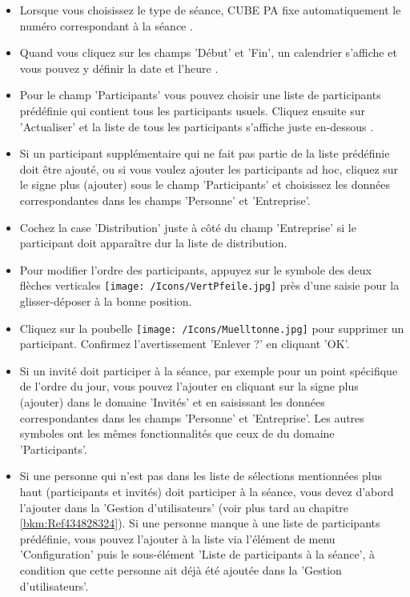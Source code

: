 \begin{itemize}
\item 
Lorsque vous choisissez le type de séance, CUBE PA fixe automatiquement le numéro correspondant à la séance .
\item 
Quand vous cliquez sur les champs 'Début' et 'Fin', un calendrier s'affiche et vous pouvez y définir la date et l'heure .
\item 
Pour le champ 'Participants' vous pouvez choisir une liste de participants prédéfinie  qui contient tous les participants usuels. Cliquez ensuite sur 'Actualiser'  et la liste de tous les participants s'affiche juste en-dessous .
\item 
Si un participant supplémentaire qui ne fait pas partie de la liste prédéfinie doit être ajouté, ou  si vous voulez ajouter les participants ad hoc, cliquez sur le signe plus (ajouter) sous le champ 'Participants'  et choisissez les données correspondantes dans les champs 'Personne' et 'Entreprise'. 
\item
Cochez la case 'Distribution'  juste à côté du champ 'Entreprise' si le participant doit apparaître dur la liste de distribution.
\item 
Pour modifier l'ordre des participants, appuyez sur le symbole des deux flèches verticales \texttt{[image: /Icons/VertPfeile.jpg]}  près d'une saisie pour la glisser-déposer à la bonne position.
\item 
Cliquez sur la poubelle \texttt{[image: /Icons/Muelltonne.jpg]}  pour supprimer un participant. Confirmez l'avertissement 'Enlever ?' en cliquant 'OK'.
\item 
Si un invité doit participer à la séance, par exemple pour un point spécifique de l'ordre du jour, vous pouvez l'ajouter en cliquant sur la signe plus (ajouter) dans le domaine 'Invités' et en saisissant les données correspondantes dans les champs 'Personne' et 'Entreprise'. Les autres symboles ont les mêmes fonctionnalités que ceux de du domaine 'Participants'.
\item 
Si une personne qui n'est pas dans les liste de sélections mentionnées plus haut (participants et invités) doit participer à la séance, vous devez d'abord l'ajouter dans la 'Gestion d'utilisateurs' (voir plus tard au chapitre \ref{bkm:Ref434828324}). Si une personne manque à une liste de participants prédéfinie, vous pouvez l'ajouter à la liste via l'élément de menu 'Configuration' puis le sous-élément 'Liste de participants à la séance', à condition que cette personne ait déjà été ajoutée dans la 'Gestion d'utilisateurs'.
\end{itemize}

